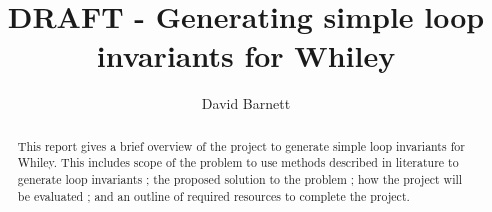 \documentclass[11pt, a4paper, twoside, openright]{report}
\title{DRAFT - Generating simple loop invariants for Whiley}
\author{David Barnett}
\date{}
\begin{document}
\frontmatter


\begin{abstract}
    This report gives a brief overview of the project to generate simple loop
    invariants for Whiley.
    This includes scope of the problem to use methods described in literature
    to generate loop invariants ; the proposed solution to the problem ; how
    the project will be evaluated ; and an outline of required resources to
    complete the project.
\end{abstract}


\maketitle




\mainmatter


%
\end{document}
